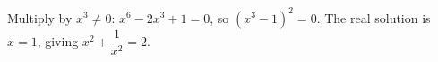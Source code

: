 Multiply by $x^3\ne0$: $x^6-2x^3+1=0$, so $(x^3-1)^2=0$. The real solution is $x=1$, giving $\boxed{x^2+\dfrac{1}{x^2}=2}$.

